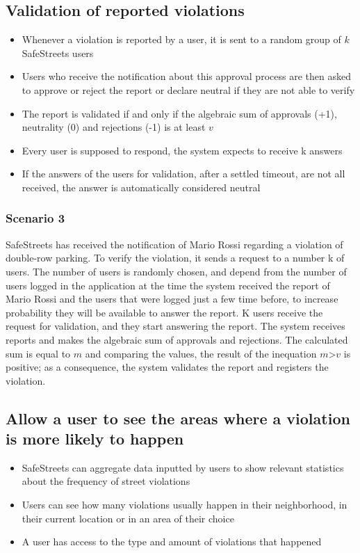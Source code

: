 \subsection{Validation of reported violations}
\begin{itemize}
    \item Whenever a violation is reported by a user, it is sent to a random group of $k$ SafeStreets users
    \item Users who receive the notification about this approval process are then asked to approve or reject the report or declare neutral if they are not able to verify
    \item The report is validated if and only if the algebraic sum of approvals (+1), neutrality (0) and rejections (-1) is at least $v$
    \item Every user is supposed to respond, the system expects to receive k answers
    \item If the answers of the users for validation, after a settled timeout, are not all received, the answer is automatically considered neutral
\end{itemize}
\subsubsection{Scenario 3}
SafeStreets has received the notification of Mario Rossi regarding a violation of double-row parking. To verify the violation, it sends a request to a 
number k of users. The number of users is randomly chosen, and depend from the number of users logged in the application at the time the system received the report of Mario Rossi
and the users that were logged just a few time before, to increase probability they will be available to answer the report. K users receive the request for validation, and they start 
answering the report. The system receives reports and makes the algebraic sum of approvals and rejections. The calculated sum is equal to $m$ and comparing the values, the result of the 
inequation $m$>$v$ is positive; as a consequence, the system validates the report and registers the violation.

\subsection{Allow a user to see the areas where a violation is more likely to happen}
\begin{itemize}
    \item SafeStreets can aggregate data inputted by users to show relevant statistics about the frequency of street violations
    \item Users can see how many violations usually happen in their neighborhood, in their current location or in an area of their choice
    \item A user has access to the type and amount of violations that happened
\end{itemize}

